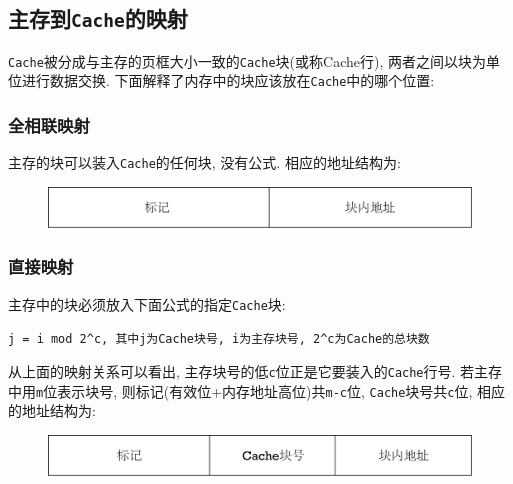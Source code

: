 \subsection{主存到\texttt{Cache}的映射}
\verb|Cache|被分成与主存的页框大小一致的\verb|Cache|块(或称Cache行), 两者之间以块为单位进行数据交换. 下面解释了内存中的块应该放在\verb|Cache|中的哪个位置:
\subsubsection{全相联映射}
主存的块可以装入\verb|Cache|的任何块, 没有公式. 相应的地址结构为:
\begin{figure}[H]
\centering
\includegraphics[scale=.5]{img/figure13.pdf}
\end{figure}
\subsubsection{直接映射}
主存中的块必须放入下面公式的指定\verb|Cache|块:
\begin{center}
\verb|j = i mod 2^c, 其中j为Cache块号, i为主存块号, 2^c为Cache的总块数|
\end{center} \par
\par 从上面的映射关系可以看出, 主存块号的低\verb|c|位正是它要装入的\verb|Cache|行号. 若主存中用\verb|m|位表示块号, 则标记(有效位+内存地址高位)共\verb|m-c|位, \verb|Cache|块号共\verb|c|位, 相应的地址结构为:
\begin{figure}[H]
\centering
\includegraphics[scale=.5]{img/figure15.pdf}
\end{figure}\par

